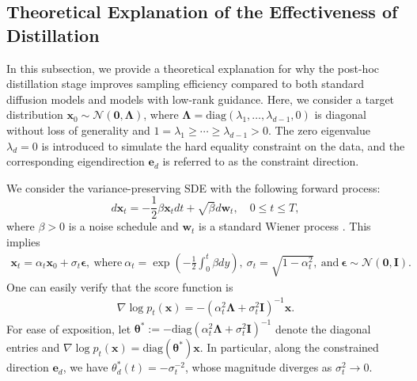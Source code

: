 \documentclass{article}
\theoremstyle{plain}
\theoremstyle{definition}
\theoremstyle{remark}
\def\vf{{\bm{f}}}
\def\vx{{\bm{x}}}
\begin{document}


\subsection{Theoretical Explanation of the Effectiveness of Distillation}\label{app:pf-sampling}

In this subsection, we provide a theoretical explanation for why the post-hoc distillation stage improves sampling efficiency compared to both standard diffusion models and models with low-rank guidance. Here, we consider a target distribution $\bm x_0 \sim \mathcal{N}(\bm 0, \bm \Lambda)$, where $\bm \Lambda = \mathrm{diag}(\lambda_1,\dots,\lambda_{d-1},0)$ is diagonal without loss of generality and $1 = \lambda_1 \ge \cdots \ge \lambda_{d-1} > 0$. The zero eigenvalue $\lambda_d=0$ is introduced to simulate the hard equality constraint on the data, and the corresponding eigendirection $\bm e_d$ is referred to as the constraint direction.

We consider the variance-preserving SDE with the following forward process:
\begin{equation*}
    d\bm x_t = -\frac{1}{2}\beta \bm x_t dt + \sqrt{\beta}d\bm w_t,\quad  0 \le t \le T,
\end{equation*}
where $\beta > 0$ is a noise schedule and $\bm w_t$ is a standard Wiener process \cite{song2020score}. This implies
\begin{align*}
    \bm x_t = \alpha_t \bm x_0 + \sigma_t\bm \epsilon,\ \text{where}\ \alpha_t = \exp\left( -\frac{1}{2}\int_0^t \beta dy \right),\ \sigma_t = \sqrt{1-\alpha_t^2},\ \text{and}\ \bm \epsilon \sim \mathcal{N}(\bm 0,\bm{I}).
\end{align*}
One can easily verify that the score function is
\begin{align*}
    \nabla \log p_t(\bm x) = -\left(\alpha_t^2\bm \Lambda + \sigma_t^2\bm{I}\right)^{-1}\bm x.
\end{align*}
For ease of exposition, let $\bm \theta^* := -\mathrm{diag}\left(\alpha_t^2\bm \Lambda + \sigma_t^2\bm{I}\right)^{-1}$ denote the diagonal entries and $ \nabla \log p_t(\bm x)=\mathrm{diag}(\bm \theta^* )\bm x$.  In particular, along the constrained direction $\bm e_d$, we have $\theta_d^*(t)=-\sigma_t^{-2}$, whose magnitude diverges as $\sigma_t^2\rightarrow 0$.
\end{document}
